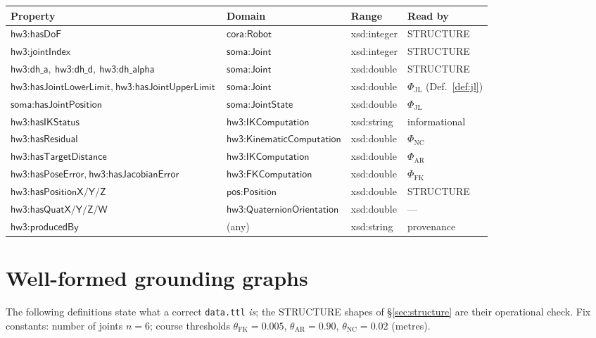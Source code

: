\documentclass[11pt,a4paper]{article}
\newcommand{\IRI}[1]{\textsf{#1}}                    %
\newcommand{\dbl}{\IRI{xsd{:}double}}
\begin{document}
\begin{center}\footnotesize
\begin{tabular}{@{}llll@{}}
\toprule
Property & Domain & Range & Read by \\
\midrule
$\IRI{hw3{:}hasDoF}$ & $\IRI{cora{:}Robot}$ & \IRI{xsd{:}integer} & \textsf{STRUCTURE} \\
$\IRI{hw3{:}jointIndex}$ & $\IRI{soma{:}Joint}$ & \IRI{xsd{:}integer} & \textsf{STRUCTURE} \\
$\IRI{hw3{:}dh\_a},\ \IRI{hw3{:}dh\_d},\ \IRI{hw3{:}dh\_alpha}$ & $\IRI{soma{:}Joint}$ & \dbl & \textsf{STRUCTURE} \\
$\IRI{hw3{:}hasJointLowerLimit},\ \IRI{hw3{:}hasJointUpperLimit}$ & $\IRI{soma{:}Joint}$ & \dbl & $\Phi_{\mathrm{JL}}$ (Def.~\ref{def:jl}) \\
$\IRI{soma{:}hasJointPosition}$ & $\IRI{soma{:}JointState}$ & \dbl & $\Phi_{\mathrm{JL}}$ \\
$\IRI{hw3{:}hasIKStatus}$ & $\IRI{hw3{:}IKComputation}$ & \IRI{xsd{:}string} & informational \\
$\IRI{hw3{:}hasResidual}$ & $\IRI{hw3{:}KinematicComputation}$ & \dbl & $\Phi_{\mathrm{NC}}$ \\
$\IRI{hw3{:}hasTargetDistance}$ & $\IRI{hw3{:}IKComputation}$ & \dbl & $\Phi_{\mathrm{AR}}$ \\
$\IRI{hw3{:}hasPoseError},\ \IRI{hw3{:}hasJacobianError}$ & $\IRI{hw3{:}FKComputation}$ & \dbl & $\Phi_{\mathrm{FK}}$ \\
$\IRI{hw3{:}hasPositionX/Y/Z}$ & $\IRI{pos{:}Position}$ & \dbl & \textsf{STRUCTURE} \\
$\IRI{hw3{:}hasQuatX/Y/Z/W}$ & $\IRI{hw3{:}QuaternionOrientation}$ & \dbl & --- \\
$\IRI{hw3{:}producedBy}$ & (any) & \IRI{xsd{:}string} & provenance \\
\bottomrule
\end{tabular}
\end{center}

\section{Well-formed grounding graphs}\label{sec:wf}

The following definitions state what a correct \texttt{data.ttl} \emph{is}; the
\textsf{STRUCTURE} shapes of \S\ref{sec:structure} are their operational check.
Fix constants: number of joints $n = 6$; course thresholds
$\theta_{\mathrm{FK}} = 0.005$, $\theta_{\mathrm{AR}} = 0.90$,
$\theta_{\mathrm{NC}} = 0.02$ (metres).
\end{document}
